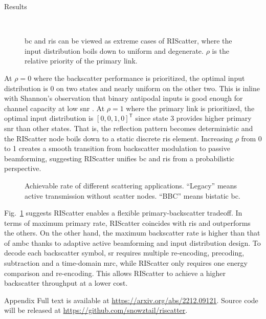 \documentclass[journal]{IEEEtran}
\begin{document}
\begin{section}{Results}
	\label{sc:simulation_results}
	\begin{figure}[H]
		\centering
		\\
		\caption{\gls{bc} and \gls{ris} can be viewed as extreme cases of RIScatter, where the input distribution boils down to uniform and degenerate. $\rho$ is the relative priority of the primary link.}
	\end{figure}
	At $\rho=0$ where the backscatter performance is prioritized, the optimal input distribution is \num{0} on two states and nearly uniform on the other two.
	This is inline with Shannon's observation that binary antipodal inputs is good enough for channel capacity at low \gls{snr} \cite{Shannon1948}.
	At $\rho=1$ where the primary link is prioritized, the optimal input distribution is $[0, 0, 1, 0]^\mathsf{T}$ since state 3 provides higher primary \gls{snr} than other states.
	That is, the reflection pattern becomes deterministic and the RIScatter node boils down to a static discrete \gls{ris} element.
	Increasing $\rho$ from \num{0} to \num{1} creates a smooth transition from backscatter modulation to passive beamforming, suggesting RIScatter unifies \gls{bc} and \gls{ris} from a probabilistic perspective.

	\begin{figure}[H]
		\centering
		\resizebox{0.7\columnwidth}{!}{
			
		}
		\caption{Achievable rate of different scattering applications. ``Legacy'' means active transmission without scatter nodes. ``BBC'' means bistatic \gls{bc}.}
		\label{fg:scatter_comparison}
	\end{figure}
	Fig.~\ref{fg:scatter_comparison} suggests RIScatter enables a flexible primary-backscatter tradeoff.
	In terms of maximum primary rate, RIScatter coincides with \gls{ris} and outperforms the others.
	On the other hand, the maximum backscatter rate is higher than that of \gls{ambc} thanks to adaptive active beamforming and input distribution design.
	To decode each backscatter symbol, \gls{sr} requires multiple re-encoding, precoding, subtraction and a time-domain \gls{mrc}, while RIScatter only requires one energy comparison and re-encoding.
	This allows RIScatter to achieve a higher backscatter throughput at a lower cost.
\end{section}

\begin{section}{Appendix}
	Full text is available at \url{https://arxiv.org/abs/2212.09121}.
	Source code will be released at \url{https://github.com/snowztail/riscatter}.
\end{section}



\end{document}
